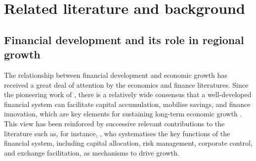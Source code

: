\documentclass[a4paper,11pt,oneside]{article}
\begin{document}
\section{Related literature and background}
\label{sec:background}

\subsection{Financial development and its role in regional growth}


The relationship between financial development and economic growth has received a great deal of attention by the economics and finance literatures. Since the pioneering work of \cite{schumpeter.theory.1911}, there is a relatively wide consensus that a well-developed financial system can facilitate capital accumulation, mobilise savings, and finance innovation, which are key elements for sustaining long-term economic growth \citep{beck2000finance,demirguc2009finance}. This view has been reinforced by successive relevant contributions to the literature such as, for instance, \cite{levine2005finance}, who systematises the key functions of the financial system, including capital allocation, risk management, corporate control, and exchange facilitation, as mechanisms to drive growth.







\end{document}
